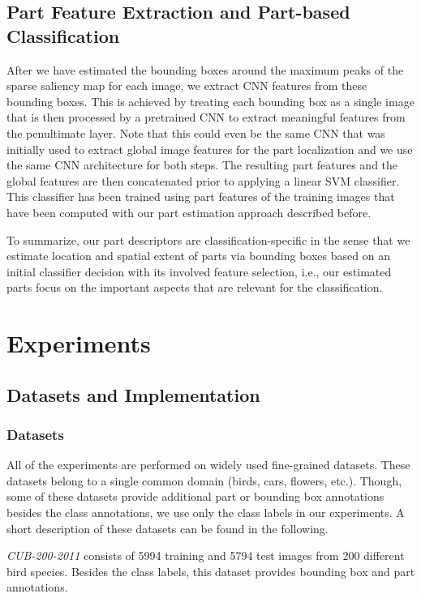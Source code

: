 \documentclass[runningheads]{llncs}
\begin{document}
\subsection{Part Feature Extraction and Part-based Classification}
\label{sub:part_feature_extraction}

After we have estimated the bounding boxes around the maximum peaks of the sparse saliency map for each image, we extract CNN features from these bounding boxes.
This is achieved by treating each bounding box as a single image that is then processed by a pretrained CNN to extract meaningful features from the penultimate layer.
Note that this could even be the same CNN that was initially used to extract global image features for the part localization and we use the same CNN architecture for both steps.
The resulting part features and the global features are then concatenated prior to applying a linear SVM classifier.
This classifier has been trained using part features of the training images that have been computed with our part estimation approach described before.

To summarize, our part descriptors are classification-specific in the sense that we estimate location and spatial extent of parts via bounding boxes based on an initial classifier decision with its involved feature selection, i.e., our estimated parts focus on the important aspects that are relevant for the classification.
 	\section{Experiments}
\label{sec:experiments}

\subsection{Datasets and Implementation}
\label{sub:datasets}
\subsubsection{Datasets}
All of the experiments are performed on widely used fine-grained datasets.
These datasets belong to a single common domain (birds, cars, flowers, etc.).
Though, some of these datasets provide additional part or bounding box annotations besides the class annotations, we use only the class labels in our experiments.
A short description of these datasets can be found in the following.

\emph{CUB-200-2011} \cite{CUB_200_2011} consists of \num{5994} training and \num{5794} test images from \num{200} different bird species.
Besides the class labels, this dataset provides bounding box and part annotations.
\end{document}
